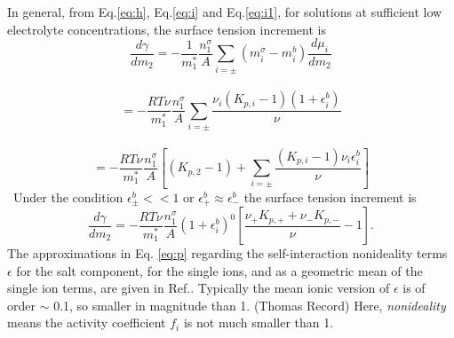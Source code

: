 In general, from Eq.\thinspace\ref{eq:h}, Eq.\thinspace\ref{eq:i} and Eq.\thinspace\ref{eq:i1}, for solutions at sufficient low electrolyte concentrations, the surface tension increment is 
\begin{equation}
\frac{d\gamma}{dm_2} = -\frac{1}{m_1^*}\frac{n_1^{\sigma}}{A}\sum_{i=\pm}(m_i^{\sigma} -m_{i}^{b})\frac{d\mu_i}{dm_2} \nonumber
\label{eq:k}
\end{equation}\
\begin{equation}
= -\frac{RT\nu}{m_1^*}\frac{n_1^{\sigma}}{A}\sum_{i=\pm} \frac{{\nu_i}(K_{p,i}-1)(1+\epsilon_i^b)}{\nu} \nonumber
\label{eq:l}
\end{equation}\
\begin{equation}
= -\frac{RT\nu}{m_1^*}\frac{n_1^{\sigma}}{A}[(K_{p,2}-1)+\sum_{i=\pm} \frac{(K_{p,i}-1)\nu_i\epsilon_i^b}{\nu}]
\label{eq:n}
\end{equation}\
Under the condition $\epsilon_{\pm}^b << 1$ or $\epsilon_{+}^b \approx \epsilon_{-}^b$
the surface tension increment is 
\begin{equation}
\frac{d\gamma}{dm_2} 
= -\frac{RT\nu}{m_1^*}\frac{n_1^{\sigma}}{A} (1+\epsilon_i^b)^0 [\frac{\nu_+ K_{p,+} + \nu_- K_{p,-}}{\nu}-1].
\label{eq:p}
\end{equation}
The approximations in Eq. \ref{eq:p} regarding the self-interaction {nonideality terms} $\epsilon$ for the salt component, 
for the single ions, and as a geometric mean of the single ion terms, are given in Ref.\cite{Pegram2006}.  
Typically the mean ionic version of $\epsilon$ is of order $\sim$ 0.1, so smaller in magnitude than 1. (Thomas Record)
Here, \emph{nonideality} means the activity coefficient $f_i$ is not much smaller than 1.
%
%
%
%
